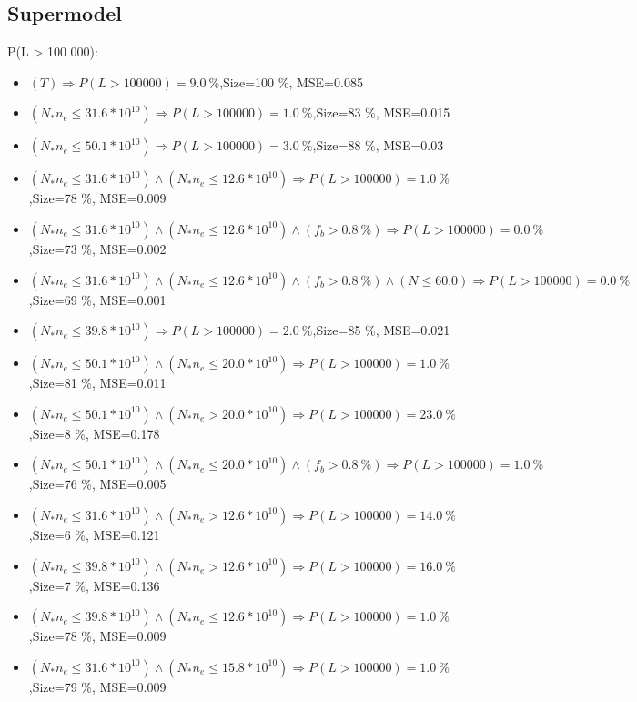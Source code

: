 \documentclass[numbered]{CSL}
\begin{document}
\subsection{Supermodel}
P(L > 100 000):
\begin{itemize}
\item $(T) \Rightarrow P(L > 100 000) = 9.0~\%$,\hfill Size=100 \%, MSE=0.085
\item $(N_* n_e \leq 31.6 * 10^{10}) \Rightarrow P(L > 100 000) = 1.0~\%$,\hfill Size=83 \%, MSE=0.015
\item $(N_* n_e \leq 50.1 * 10^{10}) \Rightarrow P(L > 100 000) = 3.0~\%$,\hfill Size=88 \%, MSE=0.03
\item $(N_* n_e \leq 31.6 * 10^{10}) \land (N_* n_e \leq 12.6 * 10^{10}) \Rightarrow P(L > 100 000) = 1.0~\%$,\hfill Size=78 \%, MSE=0.009
\item $(N_* n_e \leq 31.6 * 10^{10}) \land (N_* n_e \leq 12.6 * 10^{10}) \land (f_b > 0.8~\%) \Rightarrow P(L > 100 000) = 0.0~\%$,\hfill Size=73 \%, MSE=0.002
\item $(N_* n_e \leq 31.6 * 10^{10}) \land (N_* n_e \leq 12.6 * 10^{10}) \land (f_b > 0.8~\%) \land (N \leq 60.0) \Rightarrow P(L > 100 000) = 0.0~\%$,\hfill Size=69 \%, MSE=0.001
\item $(N_* n_e \leq 39.8 * 10^{10}) \Rightarrow P(L > 100 000) = 2.0~\%$,\hfill Size=85 \%, MSE=0.021
\item $(N_* n_e \leq 50.1 * 10^{10}) \land (N_* n_e \leq 20.0 * 10^{10}) \Rightarrow P(L > 100 000) = 1.0~\%$,\hfill Size=81 \%, MSE=0.011
\item $(N_* n_e \leq 50.1 * 10^{10}) \land (N_* n_e > 20.0 * 10^{10}) \Rightarrow P(L > 100 000) = 23.0~\%$,\hfill Size=8 \%, MSE=0.178
\item $(N_* n_e \leq 50.1 * 10^{10}) \land (N_* n_e \leq 20.0 * 10^{10}) \land (f_b > 0.8~\%) \Rightarrow P(L > 100 000) = 1.0~\%$,\hfill Size=76 \%, MSE=0.005
\item $(N_* n_e \leq 31.6 * 10^{10}) \land (N_* n_e > 12.6 * 10^{10}) \Rightarrow P(L > 100 000) = 14.0~\%$,\hfill Size=6 \%, MSE=0.121
\item $(N_* n_e \leq 39.8 * 10^{10}) \land (N_* n_e > 12.6 * 10^{10}) \Rightarrow P(L > 100 000) = 16.0~\%$,\hfill Size=7 \%, MSE=0.136
\item $(N_* n_e \leq 39.8 * 10^{10}) \land (N_* n_e \leq 12.6 * 10^{10}) \Rightarrow P(L > 100 000) = 1.0~\%$,\hfill Size=78 \%, MSE=0.009
\item $(N_* n_e \leq 31.6 * 10^{10}) \land (N_* n_e \leq 15.8 * 10^{10}) \Rightarrow P(L > 100 000) = 1.0~\%$,\hfill Size=79 \%, MSE=0.009

\end{itemize}
\end{document}
